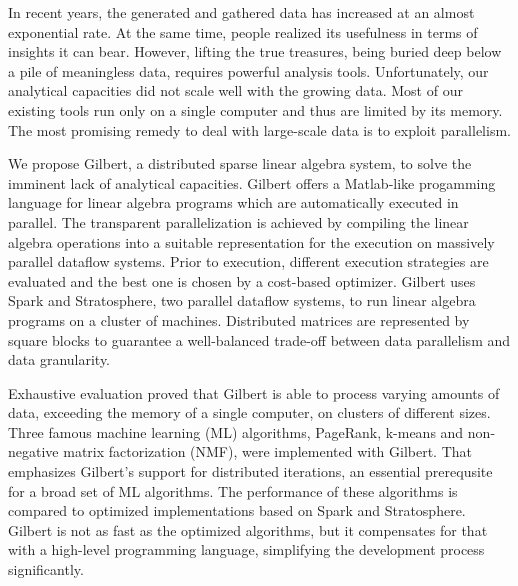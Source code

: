 \clearemptydoublepage
{}
{}

\vspace*{2cm}
\begin{center}
\end{center}
\vspace{1cm}

In recent years, the generated and gathered data has increased at an almost exponential rate.
At the same time, people realized its usefulness in terms of insights it can bear.
However, lifting the true treasures, being buried deep below a pile of meaningless data, requires powerful analysis tools.
Unfortunately, our analytical capacities did not scale well with the growing data.
Most of our existing tools run only on a single computer and thus are limited by its memory.
The most promising remedy to deal with large-scale data is to exploit parallelism.

We propose Gilbert, a distributed sparse linear algebra system, to solve the imminent lack of analytical capacities.
Gilbert offers a Matlab-like progamming language for linear algebra programs which are automatically executed in parallel.
The transparent parallelization is achieved by compiling the linear algebra operations into a suitable representation for the execution on massively parallel dataflow systems.
Prior to execution, different execution strategies are evaluated and the best one is chosen by a cost-based optimizer.
Gilbert uses Spark and Stratosphere, two parallel dataflow systems, to run linear algebra programs on a cluster of machines.
Distributed matrices are represented by square blocks to guarantee a well-balanced trade-off between data parallelism and data granularity.

Exhaustive evaluation proved that Gilbert is able to process varying amounts of data, exceeding the memory of a single computer, on clusters of different sizes.
Three famous machine learning (ML) algorithms, PageRank, k-means and non-negative matrix factorization (NMF), were implemented with Gilbert.
That emphasizes Gilbert's support for distributed iterations, an essential prerequsite for a broad set of ML algorithms.
The performance of these algorithms is compared to optimized implementations based on Spark and Stratosphere.
Gilbert is not as fast as the optimized algorithms, but it compensates for that with a high-level programming language, simplifying the development process significantly.